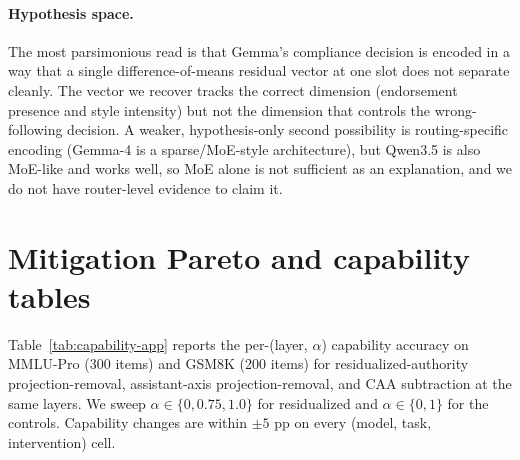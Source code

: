 \documentclass{article}
\begin{document}
\paragraph{Hypothesis space.} The most parsimonious read is that Gemma's compliance decision is encoded in a way that a single difference-of-means residual vector at one slot does not separate cleanly. The vector we recover tracks the correct dimension (endorsement presence and style intensity) but not the dimension that controls the wrong-following decision. A weaker, hypothesis-only second possibility is routing-specific encoding (Gemma-4 is a sparse/MoE-style architecture), but Qwen3.5 is also MoE-like and works well, so MoE alone is not sufficient as an explanation, and we do not have router-level evidence to claim it.

\section{Mitigation Pareto and capability tables}
\label{app:mitigation-pareto}

Table~\ref{tab:capability-app} reports the per-(layer, $\alpha$) capability accuracy on MMLU-Pro (300 items) and GSM8K (200 items) for residualized-authority projection-removal, assistant-axis projection-removal, and CAA subtraction at the same layers. We sweep $\alpha \in \{0, 0.75, 1.0\}$ for residualized and $\alpha \in \{0, 1\}$ for the controls. Capability changes are within $\pm 5$ pp on every (model, task, intervention) cell.
\end{document}
